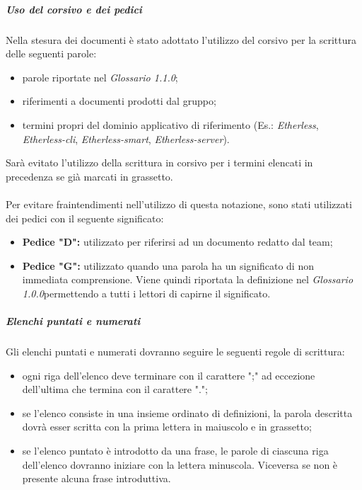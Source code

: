   \subparagraph*{Uso del corsivo e dei pedici}
  Nella stesura dei documenti è stato adottato l'utilizzo del corsivo per la scrittura delle seguenti parole:
  \begin{itemize}
  	\item parole riportate nel \textit{Glossario 1.1.0\docs};
  	\item riferimenti a documenti prodotti dal gruppo;
  	\item termini propri del dominio applicativo di riferimento (Es.: \textit{Etherless}, \textit{Etherless-cli}, \textit{Etherless-smart}, \textit{Etherless-server}).
  \end{itemize} 
  Sarà evitato l'utilizzo della scrittura in corsivo per i termini elencati in precedenza se già marcati in grassetto.\\\\
  Per evitare fraintendimenti nell'utilizzo di questa notazione, sono stati utilizzati dei pedici con il seguente significato:
    \begin{itemize}
      \item \textbf{Pedice "D":} utilizzato per riferirsi ad un documento redatto dal team;
      \item \textbf{Pedice "G":} utilizzato quando una parola ha un significato
      di non immediata comprensione. Viene quindi riportata la definizione nel
      \textit{Glossario 1.0.0}\doc permettendo a tutti i lettori di capirne il significato.
    \end{itemize}

  \subparagraph*{Elenchi puntati e numerati}
  Gli elenchi puntati e numerati dovranno seguire le seguenti regole di scrittura:
	\begin{itemize}
		\item ogni riga dell'elenco deve terminare con il carattere ";" ad eccezione dell'ultima che termina con il carattere ".";
		\item se l'elenco consiste in una insieme ordinato di definizioni, la parola descritta dovrà esser scritta con la prima lettera in maiuscolo e in grassetto;
		\item se l'elenco puntato è introdotto da una frase, le parole di ciascuna riga dell'elenco dovranno iniziare con la lettera minuscola. Viceversa se non è presente alcuna frase introduttiva. 
	\end{itemize}

